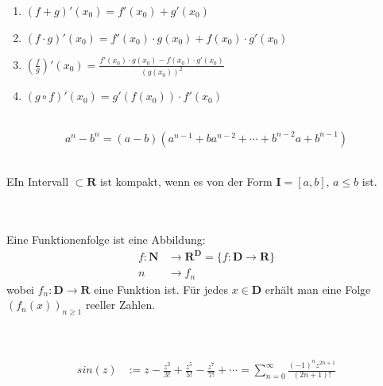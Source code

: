 \documentclass[10pt]{article}
\begin{document}
\begin{multicols*}{3}
  \begin{enumerate}[label=(\arabic*)]
    \item $(f + g)'(x_0) = f'(x_0) + g'(x_0)$
    \item $(f \cdot g)'(x_0) = f'(x_0) \cdot g(x_0) + f(x_0) \cdot g'(x_0)$
    \item $(\frac{f}{g})'(x_0) = \frac{f'(x_0) \cdot g(x_0) - f(x_0) \cdot g'(x_0)}{(g(x_0))^2}$
    \item $(g \circ f)'(x_0) = g'(f(x_0)) \cdot f'(x_0)$
  \end{enumerate}
  \\
  $$
    a^n - b^n = (a-b)(a^{n-1} + ba^{n-2} + \cdots + b^{n-2}a + b^{n-1})
  $$
  \\
  EIn Intervall $\subset \mathbf{R}$ ist kompakt, wenn es von der Form $\mathbf{I} = [a, b]$,
  $a \leq b$ ist.\\ \\
  \\
  Eine Funktionenfolge ist eine Abbildung:
  \begin{align*}
    f:\mathbf{N} & \rightarrow \mathbf{R}^\mathbf{D} = \{f:\mathbf{D} \rightarrow \mathbf{R}\} \\
    n            & \rightarrow f_n
  \end{align*}
  wobei $f_n: \mathbf{D} \rightarrow \mathbf{R}$ eine Funktion ist. Für jedes $x \in \mathbf{D}$
  erhält man eine Folge $(f_n(x))_{n \geq 1}$ reeller Zahlen.\\ \\
  \\
  \begin{align*}
    sin(z) & := z - \frac{z^3}{3!} + \frac{z^5}{5!} - \frac{z^7}{7!} + \cdots = \sum_{n = 0}^\infty \frac{(-1)^n z^{2n + 1}}{(2n+1)!} \\

\end{align*}
\end{multicols*}
\end{document}
